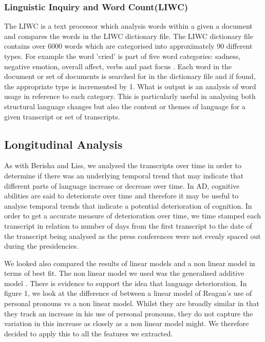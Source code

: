 \documentclass[12pt]{article}
\begin{document}
\subsubsection{Linguistic Inquiry and Word Count(LIWC)}
The LIWC is a text processor which analysis words within a given a document and compares the words in the LIWC dictionary file. The LIWC dictionary file contains over 6000 words which are categorised into approximately 90 different types. For example the word 'cried' is part of five word categories: sadness, negative emotion, overall affect, verbs and past focus \cite{Pennebaker2015}. Each word in the document or set of documents is searched for in the dictionary file and if found, the appropriate type is incremented by 1. What is output is an analysis of word usage in reference to each category. This is particularly useful in analysing both structural language changes but also the content or themes of language for a given transcript or set of transcripts.

\subsection{Longitudinal Analysis}
As with Berisha and Liss\cite{Berisha2015}, we analysed the transcripts over time in order to determine if there was an underlying temporal trend that may indicate that different parts of language increase or decrease over time. In AD, cognitive abilities are said to deteriorate over time and therefore it may be useful to analyse temporal trends that indicate a potential deterioration of cognition. In order to get a accurate measure of deterioration over time, we time stamped each transcript in relation to number of days from the first transcript to the date of the transcript being analysed as the press conferences were not evenly spaced out during the presidencies.
\par
We looked also compared the results of linear models and a non linear model in terms of best fit. The non linear model we used was the generalised additive model \cite{Hastie1986}.
There is evidence to support the idea that language deterioration. In figure 1, we look at the difference of between a linear model of Reagan's use of personal pronouns vs a non linear model. Whilst they are broadly similar in that they track an increase in his use of personal pronouns, they do not capture the variation in this increase as closely as a non linear model might. We therefore decided to apply this to all the features we extracted.
\end{document}

